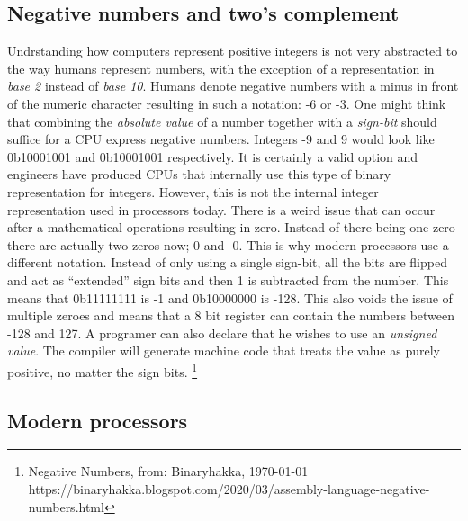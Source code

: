 \subsection{Negative numbers and two's complement}

Undrstanding how computers represent positive integers is not very abstracted to the way humans
represent numbers, with the exception of a representation in \textit{base 2} instead of \textit{base 10}. Humans
denote negative numbers with a minus in front of the numeric character resulting in such a notation: 
-6 or -3. One might think that combining the \textit{absolute value} of a number together with a \textit{sign-bit}
should suffice for a CPU express negative numbers. Integers -9 and 9 would look like 0b10001001 and
0b10001001 respectively. It is certainly a valid option and engineers have produced
CPUs that internally use this type of binary representation for integers. However, this is not the 
internal integer representation used in processors today. There is a weird issue that can occur after
a mathematical operations resulting in zero. Instead of there being one zero there are actually two 
zeros now; 0 and -0. This is why modern processors use a different notation. Instead of only using a
single sign-bit, all the bits are flipped and act as “extended” sign bits and then 1 is subtracted 
from the number. This means that 0b11111111 is -1 and 0b10000000 is -128. This also voids the issue 
of multiple zeroes and means that a 8 bit register can contain the numbers between -128 and 127. 
A programer can also declare that he wishes to use an \textit{unsigned value}. The compiler will generate
machine code that treats the value as purely positive, no matter the sign bits. \footnote{Negative Numbers, from: Binaryhakka, \today \\ https://binaryhakka.blogspot.com/2020/03/assembly-language-negative-numbers.html}



\subsection{Modern processors}

